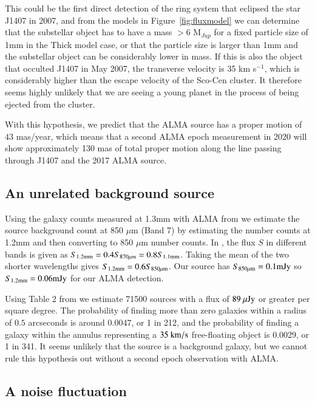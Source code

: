 \documentclass{aa} %
\newcommand{\kms}{km s$^{-1}$}
\begin{document}
This could be the first direct detection of the ring system that eclipsed the star J1407 in 2007, and from the models in Figure~\ref{fig:fluxmodel} we can determine that the substellar object has to have a mass $>$6 M$_{Jup}$ for a fixed particle size of 1mm in the Thick model case, or that the particle size is larger than 1mm and the substellar object can be considerably lower in mass.
%
If this is also the object that occulted J1407 in May 2007, the transverse velocity is 35 \kms{}, which is considerably higher than the escape velocity of the Sco-Cen cluster.
%
It therefore seems highly unlikely that we are seeing a young planet in the process of being ejected from the cluster.

With this hypothesis, we predict that the ALMA source  has a proper motion of $43$ mas/year, which means that a second ALMA epoch measurement in 2020 will show approximately 130 mas of total proper motion along the line passing through J1407 and the 2017 ALMA source.

\subsection{An unrelated background source} %

Using the galaxy counts measured at 1.3mm with ALMA from \citet{Aravena16} we estimate the source background count at 850 $\mu$m (Band 7) by estimating the number counts at 1.2mm and then converting to 850 $\mu$m number counts.
%
In \citeauthor{Aravena16}, the flux $S$ in different bands is given as $S_{1.2\rm{mm}}=0.4S_{870\mu m}=0.8S_{1.1\rm{mm}}$.
%
Taking the mean of the two shorter wavelengths gives $S_{1.2\rm{mm}}=0.6S_{\rm 850\mu m}$.
% 
Our source has $S_{\rm 850\mu m} =0.1{\rm mJy}$ so $S_{1.2\rm{mm}}=0.06 {\rm mJy}$ for our ALMA detection.

Using Table 2 from \citet{Aravena16} we estimate 71500 sources with a flux of $89\rm{~\mu Jy}$ or greater per square degree.
%
The probability of finding more than zero galaxies within a radius of $0.5$ arcseconds is around 0.0047, or 1 in 212, and the probability of finding a galaxy within the annulus representing a $35\rm{~km/s}$ free-floating object is 0.0029, or 1 in 341.
%
It seems unlikely that the source is a background galaxy, but we cannot rule this hypothesis out without a second epoch observation with ALMA.

\subsection{A noise fluctuation}
\end{document}

